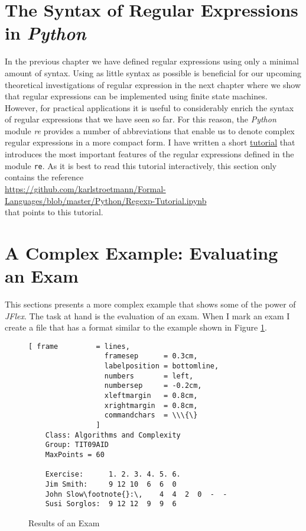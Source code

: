 \section{The Syntax of Regular Expressions in \textsl{Python}}
In the previous chapter we have defined regular expressions using only a minimal amount of syntax. 
Using as little syntax as possible is beneficial for our upcoming theoretical investigations of
regular expression in the next chapter where we show that regular expressions can be implemented
using finite state machines.  However, for practical applications it is useful to considerably
enrich the syntax of regular expressions that we have seen so far.
For this reason, the \textsl{Python} module \textsl{re} provides a number of abbreviations that enable us to denote
complex regular expressions in a more compact form.  I have written a short 
\href{https://github.com/karlstroetmann/Formal-Languages/blob/master/Python/Regexp-Tutorial.ipynb}{tutorial}
that introduces the most important features of the regular expressions defined in the module \texttt{re}.
As it is best to read this tutorial interactively, this section only contains the reference
\\[0.2cm]
\hspace*{1.3cm}
\href{https://github.com/karlstroetmann/Formal-Languages/blob/master/Python/Regexp-Tutorial.ipynb}{https://github.com/karlstroetmann/Formal-Languages/blob/master/Python/Regexp-Tutorial.ipynb}
\\[0.2cm]
that points to this tutorial.

\section{A Complex Example: Evaluating an Exam}
This sections presents a more complex example that shows some of the power of \textsl{JFlex}.  The
task at hand is the evaluation of an exam.  When I mark an exam I create a file that has a format
similar to the example shown in Figure \ref{fig:result.txt}. 

\begin{figure}[!h]
\centering
\begin{Verbatim}[ frame         = lines, 
                  framesep      = 0.3cm, 
                  labelposition = bottomline,
                  numbers       = left,
                  numbersep     = -0.2cm,
                  xleftmargin   = 0.8cm,
                  xrightmargin  = 0.8cm,
                  commandchars  = \\\{\}
                ]
    Class: Algorithms and Complexity
    Group: TIT09AID
    MaxPoints = 60
   
    Exercise:      1. 2. 3. 4. 5. 6.
    Jim Smith:     9 12 10  6  6  0
    John Slow\footnote{}:\,    4  4  2  0  -  -
    Susi Sorglos:  9 12 12  9  9  6
\end{Verbatim}
\vspace*{-0.3cm}
\caption{Results of an Exam}
\label{fig:result.txt}
\end{figure}

